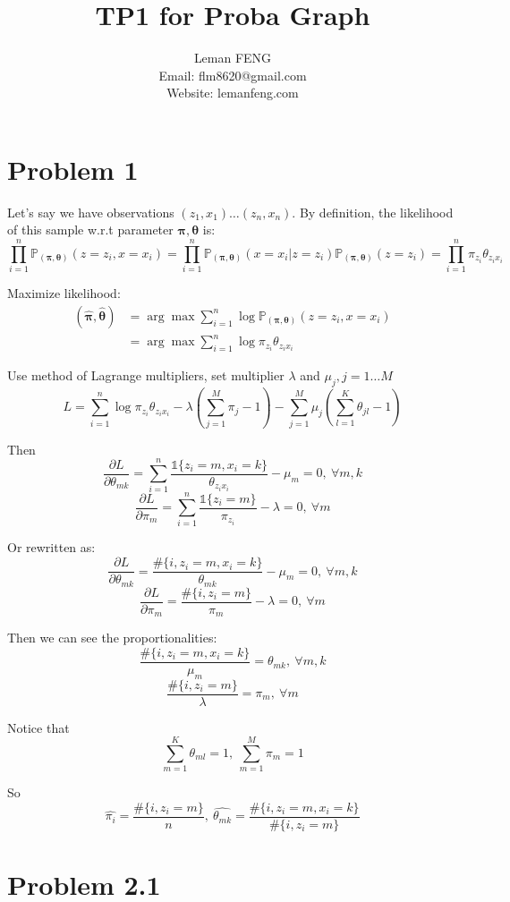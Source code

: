 \documentclass{article}
\title{TP1 for Proba Graph}
\author{Leman FENG\\ Email: flm8620@gmail.com\\Website: lemanfeng.com}
\newcommand{\bs}[1]{\boldsymbol{#1}}
\newcommand{\pd}[2]{\frac{\partial {#1}}{\partial {#2}}}
\begin{document}
	\maketitle
	\section{Problem 1}
	
	Let's say we have observations $(z_1,x_1) \dots (z_n,x_n)$. By definition, the likelihood of this sample w.r.t parameter $\bs{\pi},\bs{\theta}$ is:
	$$
	\prod_{i=1}^n \mathbb{P}_{(\bs{\pi},\bs{\theta})}(z=z_i,x=x_i) = 
	\prod_{i=1}^n \mathbb{P}_{(\bs{\pi},\bs{\theta})}(x=x_i | z=z_i) \mathbb{P}_{(\bs{\pi},\bs{\theta})}(z=z_i)=
	\prod_{i=1}^n \pi_{z_i} \theta_{z_ix_i}
	$$
	
	Maximize likelihood:
	\begin{equation*}
	\begin{split}
	(\hat{\bs{\pi}},\hat{\bs{\theta}}) &= \arg\max \sum_{i=1}^n \log \mathbb{P}_{(\bs{\pi},\bs{\theta})}(z=z_i,x=x_i)\\
	&= \arg\max \sum_{i=1}^n \log \pi_{z_i} \theta_{z_ix_i}
	\end{split}
	\end{equation*}
	
	Use method of Lagrange multipliers, set multiplier $\lambda$ and $\mu_j, j=1\dots M$
	$$
	L = \sum_{i=1}^n \log \pi_{z_i} \theta_{z_ix_i} - \lambda (\sum_{j=1}^M \pi_j - 1) - \sum_{j=1}^M \mu_j (\sum_{l=1}^K \theta_{jl} - 1)
	$$
	
	Then
	$$
	\pd{L}{\theta_{mk}} = \sum_{i=1}^n \frac{\mathbb{1}\{z_i=m,x_i=k\}}{\theta_{z_ix_i}} - \mu_m = 0, \  \forall m,k
	$$
	$$
	\pd{L}{\pi_m} = \sum_{i=1}^n \frac{\mathbb{1}\{z_i=m\}}{\pi_{z_i}} - \lambda = 0, \  \forall m
	$$
	
	Or rewritten as:
	$$
	\pd{L}{\theta_{mk}} = \frac{\#\{i,z_i=m,x_i=k\}}{\theta_{mk}} - \mu_m = 0, \  \forall m,k
	$$
	$$
	\pd{L}{\pi_m} = \frac{\#\{i,z_i=m\}}{\pi_m} - \lambda = 0, \  \forall m
	$$
	
	Then we can see the proportionalities:
	$$
	\frac{\#\{i,z_i=m,x_i=k\}}{\mu_m} = \theta_{mk}, \  \forall m,k
	$$
	$$
	\frac{\#\{i,z_i=m\}}{\lambda} = \pi_m, \  \forall m
	$$
	
	Notice that
	$$
	\sum_{m=1}^K \theta_{ml} = 1, \ \sum_{m=1}^M \pi_m = 1
	$$
	
	So
	$$
	\hat{\pi_i} = \frac{\#\{i,z_i=m\}}{n}, \ \hat{\theta_{mk}} = \frac{\#\{i,z_i=m,x_i=k\}}{\#\{i,z_i=m\}}
	$$
	
	\section{Problem 2.1}
\end{document}
